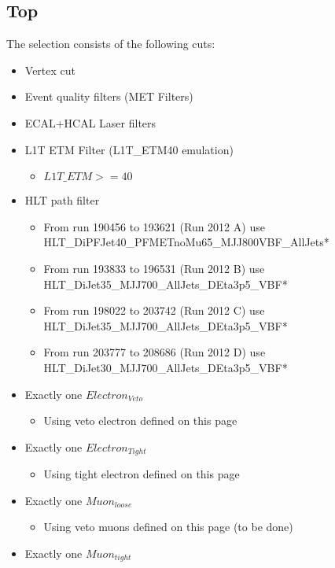 


\subsection{Top}

The selection consists of the following cuts:
\begin{itemize}
  \item Vertex cut 
  \item Event quality filters (MET Filters)
  \item ECAL+HCAL Laser filters
  \item L1T ETM Filter (L1T\_ETM40 emulation)
  \begin{itemize}
    \item $ L1T\_ETM >= 40 $
  \end{itemize}
  \item HLT path filter
  \begin{itemize}
    \item From run 190456 to 193621 (Run 2012 A) use HLT\_DiPFJet40\_PFMETnoMu65\_MJJ800VBF\_AllJets* 
    \item From run 193833 to 196531 (Run 2012 B) use HLT\_DiJet35\_MJJ700\_AllJets\_DEta3p5\_VBF*
    \item From run 198022 to 203742 (Run 2012 C) use HLT\_DiJet35\_MJJ700\_AllJets\_DEta3p5\_VBF*
    \item From run 203777 to 208686 (Run 2012 D) use HLT\_DiJet30\_MJJ700\_AllJets\_DEta3p5\_VBF*
  \end{itemize}
  \item Exactly one $Electron_{Veto}$
  \begin{itemize}
    \item Using veto electron defined on this page
  \end{itemize}
  \item Exactly one $Electron_{Tight}$
  \begin{itemize}
    \item Using tight electron defined on this page
  \end{itemize}
  \item Exactly one $Muon_{loose}$
  \begin{itemize}
    \item Using veto muons defined on this page (to be done)
  \end{itemize}
  \item Exactly one $Muon_{tight}$

\end{itemize}
